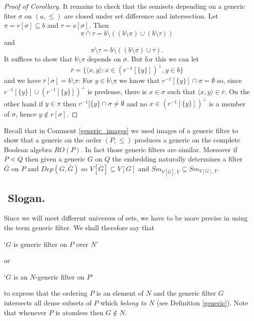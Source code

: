 \begin{proof}[Proof of Corollary]
 It remains to check that the semisets depending on a generic fiter $\sigma$ on $(a,\leq)$ are closed
 under set difference and intersection. Let $\pi=r[\sigma]\subseteq b$ and $\tau=s[\sigma]$. Then
 $$
 \pi\cap\tau = b\setminus((b\setminus\pi)\cup(b\setminus\tau))
 $$
 and
 $$
 \pi\setminus\tau = b\setminus((b\setminus\pi)\cup\tau).
 $$
 It suffices to show that $b\setminus\pi$ depends on $\sigma$. But for this we can let
 $$
 \bar{r}=\{\langle x,y\rangle:x\in(r^{-1}[\{y\}])^\perp, y\in b\}
 $$
 and we have $\bar{r}[\sigma]=b\setminus\pi$: For $y\in b\setminus\pi$ we know that $r^{-1}[\{y\}]\cap\sigma=\emptyset$ so,
 since $r^{-1}[\{y\}]\cup (r^{-1}[\{y\}])^\perp$ is predense, there is $x\in\sigma$ such that $\langle x,y\rangle\in\bar{r}$.
 On the other hand if $y\in\pi$ then $r^{-1}[\{y\}\cap\sigma\neq\emptyset$ and no $x\in(r^{-1}[\{y\}])^\perp$ is a member of $\sigma$,
 hence $y\not\in r[\sigma]$.
\end{proof}



Recall that in Comment \ref{generic_images} we used images of a generic filter
to show that a generic on the order $(P,\leq)$ produces a generic on the complete
Boolean algebra $RO(P)$. In fact those generic filters are similar. Moreover
if $P\lessdot Q$ then given a generic $G$ on $Q$ the embedding naturally determines
a filter $\bar{G}$ on $P$ and $Dep(G,\bar{G})$ so $V[\bar{G}]\subseteq V[G]$ and
$Sm_{V[\bar{G}],V}\subseteq Sm_{V[G],V}$.

\smallskip



\subsection{${}$ \hspace{-1em}Slogan.}
Since we will meet different universes of sets, we have to be
more precise in using the term generic filter. We shall therefore say that
\begin{center}
 `$G$ is generic filter on $P$ over $N$'
\end{center}
or
\begin{center}
 `$G$ is an $N$-generic filter on $P$'
\end{center}
\noindent to express that the ordering $P$ is an element of $N$ and the generic filter $G$
intersects all dense subsets of $P$ which \emph{belong to $N$} (see
Definition \ref{generic}). Note that whenever $P$ is atomless then $G \not \in N$.


